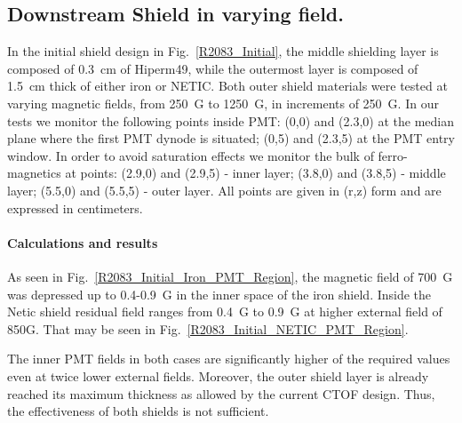 \documentclass[12pt]{article}
\begin{document}


\subsection{Downstream Shield  in varying field.} 
\label{R2083_Triple_No_Coil}
In the initial shield design in Fig.~\ref{R2083_Initial}, the middle shielding 
layer is composed of 0.3~cm of Hiperm49, while the outermost layer is composed
of 1.5~cm thick of either iron or NETIC. Both outer shield materials were
tested at varying magnetic fields, from 250~G to 1250~G, in increments of 250~G.
In our tests we  monitor the following  points inside PMT:
 (0,0) and (2.3,0) at  the median plane where the  first PMT dynode is situated;
 (0,5) and (2.3,5) at  the PMT entry window.
In order to avoid  saturation effects we monitor the bulk of ferro-magnetics at points:
 (2.9,0) and (2.9,5) - inner layer; 
 (3.8,0) and (3.8,5) - middle layer; 
(5.5,0) and (5.5,5)  - outer layer.
All points are given in (r,z) form and are expressed in centimeters.
\paragraph{Calculations and results}
 As seen in Fig.~\ref{R2083_Initial_Iron_PMT_Region},
the  magnetic field of 700~G  was depressed up to 0.4-0.9~G in the inner space  of  the
iron shield.
 Inside the Netic shield  residual field ranges from 0.4~G to 0.9~G at higher external  field of
850G. That  may be  seen  in Fig.~\ref{R2083_Initial_NETIC_PMT_Region}.

The inner PMT fields in both cases  are  significantly  higher of the  required values  even 
at  twice lower external fields. Moreover, the outer shield layer is already  reached  its maximum 
thickness as allowed by the current CTOF design.  Thus, the effectiveness  of both shields is not sufficient. 
\end{document}
